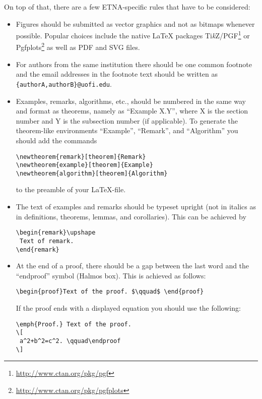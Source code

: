 \documentclass[parskip=half]{scrartcl}
\begin{document}
On top of that, there are a few ETNA-specific rules that have to be considered:

\begin{itemize}
\item Figures should be submitted as vector graphics and not as bitmaps
  whenever possible. Popular choices include the native \LaTeX{} packages
  Ti\textit{k}Z/PGF\footnote{\url{http://www.ctan.org/pkg/pgf}} or
  Pgfplots\footnote{\url{http://www.ctan.org/pkg/pgfplots}} as well as PDF and
  SVG files.

\item For authors from the same institution there should be one common footnote
  and the email addresses in the footnote text should be written as
  \texttt{\{authorA,authorB\}@uofi.edu}.

%
%
\item Examples, remarks, algorithms, etc., should be numbered in the same way
  and format as theorems, namely as ``Example X.Y'', where X is the section
  number and Y is the subsection number (if applicable). To generate the
  theorem-like environments ``Example'', ``Remark'', and ``Algorithm'' you
  should add the commands
\begin{verbatim}
\newtheorem{remark}[theorem]{Remark}
\newtheorem{example}[theorem]{Example}
\newtheorem{algorithm}[theorem]{Algorithm}
\end{verbatim}
to the preamble of your \LaTeX-file.
%
\item The text of examples and remarks should be typeset upright (not in
  italics as in definitions, theorems, lemmas, and corollaries).  This can be
  achieved by
\begin{verbatim}
\begin{remark}\upshape
 Text of remark.
\end{remark}
\end{verbatim}
%
\item  At the end of a proof, there should be a gap between the last word and
  the ``endproof'' symbol (Halmos box). This is achieved as follows:
\begin{verbatim}
\begin{proof}Text of the proof. $\qquad$ \end{proof}
\end{verbatim}
If the proof ends with a displayed equation you should use the following:
\begin{verbatim}
\emph{Proof.} Text of the proof.
\[
 a^2+b^2=c^2. \qquad\endproof
\]
\end{verbatim}


\end{itemize}
\end{document}
